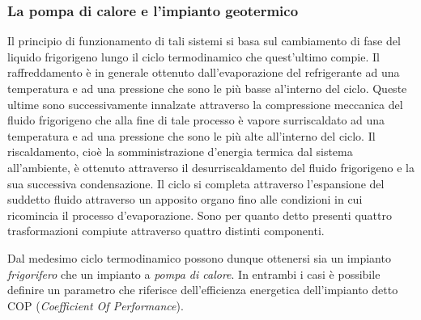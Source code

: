 \subsubsection{La pompa di calore e l'impianto geotermico}
Il principio di funzionamento di tali sistemi si basa sul cambiamento di fase del liquido frigorigeno lungo il ciclo termodinamico che quest'ultimo compie. Il raffreddamento è in generale ottenuto dall'evaporazione del refrigerante ad una temperatura e ad una pressione che sono le più basse al'interno del ciclo. Queste ultime sono successivamente innalzate attraverso la compressione meccanica del fluido frigorigeno che alla fine di tale processo è vapore surriscaldato ad una temperatura e ad una pressione che sono le più alte all'interno del ciclo. Il riscaldamento, cioè la somministrazione d'energia termica dal sistema all'ambiente, è ottenuto attraverso il desurriscaldamento del fluido frigorigeno e la sua successiva condensazione. Il ciclo si completa attraverso l'espansione del suddetto fluido attraverso un apposito organo fino alle condizioni in cui ricomincia il processo d'evaporazione. Sono per quanto detto presenti quattro trasformazioni compiute attraverso quattro distinti componenti.

Dal medesimo ciclo termodinamico possono dunque ottenersi sia un impianto \emph{frigorifero} che un impianto a \emph{pompa di calore}. In entrambi i casi è possibile definire un parametro che riferisce dell'efficienza energetica dell'impianto detto COP (\emph{Coefficient Of Performance}). 

